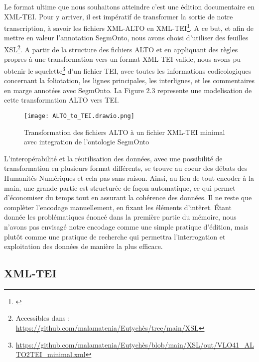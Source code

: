 \documentclass[a4paper, twoside, 12pt]{book}
\begin{document}
Le format ultime que nous souhaitons atteindre c'est une édition documentaire en XML-TEI. Pour y arriver, il est impératif de transformer la sortie de notre transcription, à savoir les fichiers XML-ALTO en XML-TEI\footnote{\cite{janes2021towards}}. A ce but, et afin de mettre en valeur l'annotation SegmOnto, nous avons choisi d'utiliser des feuilles XSL\footnote{ Accessibles dans : \url{https://github.com/malamatenia/Eutychès/tree/main/XSL}}. A partir de la structure des fichiers ALTO et en appliquant des règles propres à une transformation vers un format XML-TEI valide, nous avons pu obtenir le squelette\footnote{\url{https://github.com/malamatenia/Eutychès/blob/main/XSL/out/VLO41_ALTO2TEI_minimal.xml}} d'un fichier TEI, avec toutes les informations codicologiques concernant la foliotation, les lignes principales, les interlignes, et les commentaires en marge annotées avec SegmOnto. La Figure 2.3 represente une modelisation de cette transformation ALTO vers TEI. \\

\begin{figure}[H]
    \centering
    \texttt{[image: ALTO\_to\_TEI.drawio.png]}
    \caption{ Transformation des fichiers ALTO à un fichier XML-TEI minimal avec integration de l'ontologie SegmOnto }
\end{figure}


L'interopérabilité et la réutilisation des données, avec une possibilité de transformation en plusieurs format différents, se trouve au coeur des débats des Humanités Numériques et cela pas sans raison. Ainsi, au lieu de tout encoder à la main, une grande partie est structurée de façon automatique, ce qui permet d'économiser du temps tout en assurant la cohérence des données. Il ne reste que complèter l'encodage manuellement, en fixant les éléments d'intêret. Étant donnée les problématiques énoncé dans la première partie du mémoire, nous n’avons pas envisagé notre encodage comme une simple pratique d’édition, mais plutôt comme une pratique de recherche qui permettra l'interrogation et exploitation des données de manière la plus efficace.

\subsection{XML-TEI}
\end{document}
